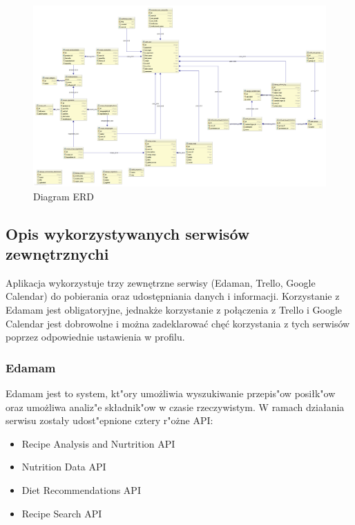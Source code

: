 \documentclass{article}
\begin{document}
\begin{landscape}
\begin{figure}[!ht]
  \centering
    \includegraphics[width=1.5\textwidth]{erd}\par\vspace{1cm}
  \caption{Diagram ERD}
\end{figure}
\end{landscape}

\subsection{Opis wykorzystywanych serwisów zewnętrznychi}

	Aplikacja wykorzystuje trzy zewnętrzne serwisy (Edaman, Trello, Google Calendar) do pobierania oraz udostępniania danych i informacji. Korzystanie z Edamam jest obligatoryjne, jednakże korzystanie z połączenia z Trello i Google Calendar jest dobrowolne i można zadeklarować chęć korzystania z tych serwisów poprzez odpowiednie ustawienia w profilu.

\subsubsection{Edamam}
	Edamam jest to system, kt"ory umo\.zliwia wyszukiwanie przepis"ow posiłk"ow oraz umo\.zliwa analiz"e składnik"ow w czasie rzeczywistym. W ramach działania serwisu zostały udost"epnione cztery r"o\.zne API:
	\begin{itemize}
		\item Recipe Analysis and Nurtrition API
		\item Nutrition Data API
		\item Diet Recommendations API
		\item Recipe Search API
	\end{itemize}
	
\end{document}
